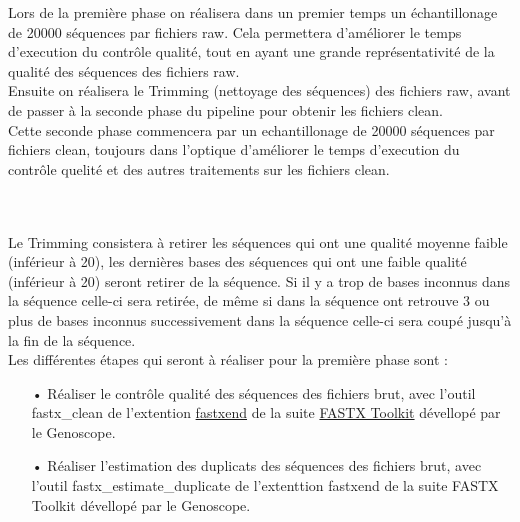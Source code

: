 \begin{minipage}{0.45\textwidth}

    Lors de la première phase on réalisera dans un premier temps un échantillonage de 20000 séquences par fichiers \og raw\fg{}. Cela permettera d'améliorer le temps d'execution du contrôle qualité, tout en ayant une grande représentativité de la qualité des séquences des fichiers \og raw\fg{}.\\

    Ensuite on réalisera le \og Trimming\fg{} (nettoyage des séquences) des fichiers \og raw\fg{}, avant de passer à la seconde phase du pipeline pour obtenir les fichiers \og clean\fg{}.\\

    Cette seconde phase commencera par un echantillonage de 20000 séquences par fichiers \og clean\fg{}, toujours dans l'optique d'améliorer le temps d'execution du contrôle quelité et des autres traitements sur les fichiers \og clean\fg{}.


\end{minipage}\\\\

Le Trimming consistera à retirer les séquences qui ont une qualité moyenne faible (inférieur à 20), les dernières bases des séquences qui ont une faible qualité (inférieur à 20) seront retirer de la séquence. Si il y a trop de bases inconnus dans la séquence celle-ci sera retirée, de même si dans la séquence ont retrouve 3 ou plus de bases inconnus successivement dans la séquence celle-ci sera coupé jusqu'à la fin de la séquence.\\


Les différentes étapes qui seront à réaliser pour la première phase sont :\\
\begin{itemize}
    \item[•] Réaliser le contrôle qualité des séquences des fichiers brut, avec l'outil fastx\_clean de l'extention \href{https://github.com/institut-de-genomique/fastxtend}{fastxend} de la suite \href{http://hannonlab.cshl.edu/fastx_toolkit/}{FASTX Toolkit} dévellopé par le Genoscope.
    \item[•] Réaliser l'estimation des duplicats des séquences des fichiers brut, avec l'outil fastx\_estimate\_duplicate de l'extenttion fastxend de la suite FASTX Toolkit dévellopé par le Genoscope.\\
\end{itemize}

